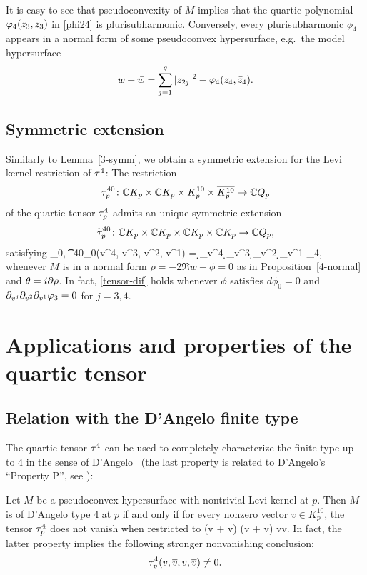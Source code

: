\documentclass[12pt]{amsart}
\begin{document}
\br
It is easy to see that pseudoconvexity of $M$ implies that the quartic polynomial 
$\varphi_4(z_3,{\bar z}_3)$ in \eqref{phi24} is plurisubharmonic. 
Conversely, every plurisubharmonic $\phi_4$ appears
in a normal form of some pseudoconvex hypersurface,
e.g.\ the model hypersurface 
$$
	w+ {\bar w} = \sum_{j=1}^q |z_{2j}|^2  + \varphi_4(z_4, {\bar z}_4).
$$
\er

\subsection{Symmetric extension}
Similarly to Lemma~\ref{3-symm}, we obtain a symmetric extension
for the Levi kernel restriction of $\tau^4$:
\bl{}
The restriction 
$$
	\tau^{40}_p \colon {\mathbb{C}} K_p\times  {\mathbb{C}} K_p \times K^{10}_p\times \overline{K^{10}_p} \to {\mathbb{C}} Q_p
$$ 
of the quartic tensor $\tau^4_p$
 admits an unique symmetric extension
$$
	\widetilde{\tau}^{40}_p \colon
	{\mathbb{C}} K_p \times {\mathbb{C}} K_p\times {\mathbb{C}} K_p \times {\mathbb{C}} K_p \to {\mathbb{C}} Q_p,
$$
satisfying
\beq{}
	\la \th_0,  \2\t^{40}_0(v^4, v^3, v^2, v^1) \ra
	= \d_{v^4} \d_{v^3} \d_{v^2} \d_{v^1} \phi_4,
\eeq
whenever $M$ is in a normal form $\rho= -2\Re w +\phi=0$
as in Proposition~\ref{4-normal}
and $\theta = i\partial\rho$.
In fact, \eqref{tensor-dif}
holds whenever
$\phi$
satisfies $d\phi_0=0$
and 
$ \partial_{v^j} \partial_{v^2} \partial_{v^1} \varphi_3=0$
for $j=3,4$.
\el




\section{Applications and properties of the quartic tensor}

\subsection{Relation with the D'Angelo finite type}
The quartic tensor $\tau^4$ can be used to completely characterize
the finite type up to $4$ in the sense of D'Angelo~\cite{D82}
(the last property is related to D'Angelo's ``Property P'', see \cite[Definition~5.1]{D82}):
%

\bp{}
Let $M$ be a pseudoconvex hypersurface
with nontrivial Levi kernel at $p$.
Then $M$ is of D'Angelo type $4$ at $p$
if and only if for every nonzero vector $v\in K^{10}_p$, the tensor $\tau^4_p$
does not vanish when restricted to 
\beq{}
	(\C v + \C \1v) \times (\C v + \C \1v) \times \C v\times \C \1v.
\eeq
In fact, the latter property implies the following stronger nonvanishing conclusion:
$$
	\tau^4_p(v,\overline{v}, v, \overline{v}) \ne 0.
$$
\ep
\end{document}

